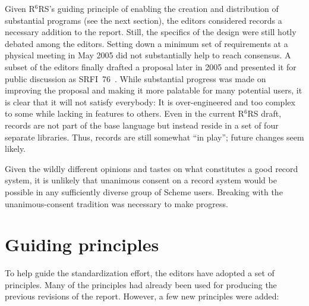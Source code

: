 \documentclass{acm_proc_article-sp}
\newcommand{\rn}[1]{R$^{#1}$RS}
\begin{document}
Given \rn{6}'s guiding principle of enabling the creation and
distribution of substantial programs (see the next section), the
editors considered records a necessary addition to the report.  Still,
the specifics of the design were still hotly debated among the
editors.  Setting down a minimum set of requirements at a physical
meeting in May 2005 did not substantially help to reach consensus.  A
subset of the editors finally drafted a proposal later in 2005 and
presented it for public discussion as SRFI~76~\cite{srfi76}.  While
substantial progress was made on improving the proposal and making it
more palatable for many potential users, it is clear that it will not
satisfy everybody: It is over-engineered and too complex to some while
lacking in features to others.  Even in the current \rn{6} draft,
records are not part of the base language but instead reside in a set
of four separate libraries.  Thus, records are still somewhat ``in
play''; future changes seem likely.

Given the wildly different opinions and tastes on what constitutes a
good record system, it is unlikely that unanimous consent on a record
system would be possible in any sufficiently diverse group of Scheme users.
Breaking with the unanimous-consent tradition was necessary to make
progress.

\section{Guiding principles}
\label{sec:principles}

To help guide the standardization effort, the editors have adopted a
set of principles.  Many of the principles had already been used for
producing the previous revisions of the report.  However, a few new
principles were added:
\end{document}
